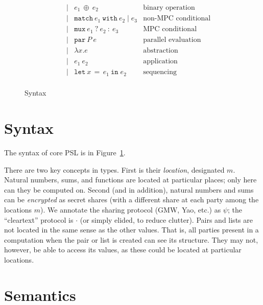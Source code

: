 \documentclass[10pt]{article}
\newcommand{\kw}[1]{\ensuremath{\mathtt{#1}}}
\newcommand{\ebinop}[2]{\ensuremath{{#1}~\oplus~{#2}}}
\newcommand{\elet}[3]{\ensuremath{\kw{let}~#1\, =\, #2~\kw{in}\;{#3}}}
\newcommand{\epar}[2]{\ensuremath{\kw{par}~{#1}~{#2}}}
\newcommand{\esec}[2]{\ensuremath{\kw{sec}~{#1}~{#2}}}
\newcommand{\econd}[3]{\ensuremath{\kw{match}~{#1}~\kw{with}~{#2} \mid {#3}}}
\newcommand{\emux}[3]{\ensuremath{\kw{mux}~{#1}~\kw{?}~{#2}~\kw{:}~{#3}}}
\newcommand{\elam}[2]{\ensuremath{\lambda {#1}.{#2}}}
\newcommand{\eapp}[2]{\ensuremath{{#1}~{#2}}}
\begin{document}
\begin{figure}[h]
\[\begin{array}{rlcll}
                       && \mid & \ebinop{e_1}{e_2}  & \text{binary operation} \\
                       && \mid & \econd{e_1}{e_2}{e_3}  & \text{non-MPC conditional} \\
                       && \mid & \emux{e_1}{e_2}{e_3}  & \text{MPC conditional} \\
                       && \mid & \epar{P}{e} & \text{parallel evaluation}\\
                       && \mid & \elam{x}{e}  & \text{abstraction} \\
                       && \mid & \eapp{e_1}{e_2}  & \text{application} \\
                       && \mid & \elet{x}{e_1}{e_2}  & \text{sequencing} \\
  \end{array}
  \]
  \caption{Syntax}
  \label{fig:syntax}
\end{figure}

\newpage

\section{Syntax}
  
The syntax of core PSL is in Figure~\ref{fig:syntax}.

There are two key concepts in types. First is their \emph{location},
designated $m$. Natural numbers, sums, and functions are located at
particular places; only here can they be computed on. Second (and in
addition), natural numbers and sums can be \emph{encrypted} as secret
shares (with a different share at each party among the locations
$m$). We annotate the sharing protocol (GMW, Yao, etc.) as $\psi$; the
``cleartext'' protocol is $\cdot$ (or simply elided, to reduce
clutter). Pairs and lists are not located in the same sense as the
other values. That is, all parties present in a computation when the
pair or list is created can see its structure. They may not, however,
be able to access its values, as these could be located at particular
locations.

\section{Semantics}
\end{document}
